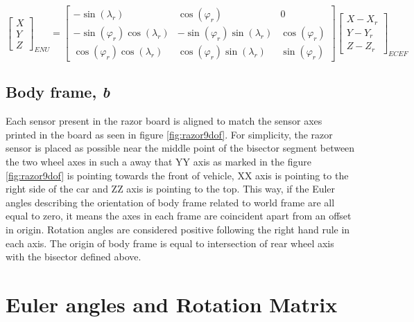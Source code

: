 \begin{equation}
\begin{bmatrix}
X\\
Y\\
Z
\end{bmatrix}_{ENU} =
\begin{bmatrix}
-\sin(\lambda_r)   				& \cos(\varphi_r) 				  & 0               \\
-\sin(\varphi_r)\cos(\lambda_r) & -\sin(\varphi_r)\sin(\lambda_r) & \cos(\varphi_r) \\
\cos(\varphi_r)\cos(\lambda_r)  & \cos(\varphi_r)\sin(\lambda_r)  & \sin(\varphi_r)  
\end{bmatrix}
\begin{bmatrix}
X-X_r\\
Y-Y_r\\
Z-Z_r
\end{bmatrix}_{ECEF}
\label{eq:ecef_enu}
\end{equation}

\subsection{Body frame, \textit{b}}\label{subsection:body_frame}

Each sensor present in the razor board is aligned to match the sensor axes
printed in the board as seen in figure \ref{fig:razor9dof}. For simplicity, the
razor sensor is placed as possible near the middle point of the bisector
segment between the two wheel axes in such a away that YY axis as marked in the
figure \ref{fig:razor9dof} is pointing towards the front of vehicle, XX axis is
pointing to the right side of the car and ZZ axis is pointing to the top. This
way, if the Euler angles describing the orientation of body frame related to
world frame are all equal to zero, it means the axes in each frame are
coincident apart from an offset in origin.
Rotation angles are considered positive following the right hand rule in each axis.
The origin of body frame is equal to intersection of rear wheel axis with the bisector defined above.

\section{Euler angles and Rotation Matrix} \label{section:euler_matrix_def}

